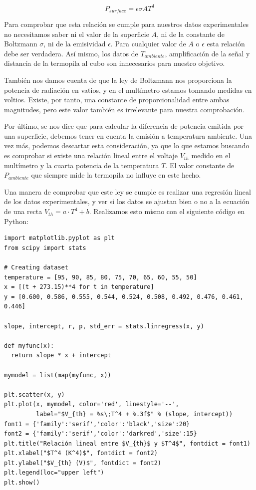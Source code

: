\begin{enumerate}
    \begin{equation*}
        P_{surface} = \epsilon \sigma A T^4
    \end{equation*}

    Para comprobar que esta relación se cumple para nuestros datos experimentales no necesitamos saber ni el valor de la superficie $A$,
    ni de la constante de Boltzmann $\sigma$, ni de la emisividad $\epsilon$. Para cualquier valor de $A$ o $\epsilon$ esta relación
    debe ser verdadera. Así mismo, los datos de $T_{ambiente}$, amplificación de la señal y distancia de la termopila al cubo
    son innecesarios para nuestro objetivo.

    También nos damos cuenta de que la ley de Boltzmann nos proporciona la potencia de radiación en vatios, y en el multímetro estamos tomando
    medidas en voltios. Existe, por tanto, una constante de proporcionalidad entre ambas magnitudes, pero este valor también
    es irrelevante para nuestra comprobación.

    Por último, se nos dice que para calcular la diferencia de potencia emitida por una superficie, debemos tener en cuenta la emisión a temperatura ambiente.
    Una vez más, podemos descartar esta consideración, ya que lo que estamos buscando es comprobar si existe una relación lineal
    entre el voltaje $V_{th}$ medido en el multímetro y la cuarta potencia de la temperatura $T$. El valor constante de $P_{ambiente}$
    que siempre mide la termopila no influye en este hecho.

    Una manera de comprobar que este ley se cumple es realizar una regresión lineal de los datos experimentales, y ver si los datos se ajustan bien o no
    a la ecuación de una recta $V_{th} = a \cdot T^4 + b$. Realizamos esto mismo con el siguiente código en Python:\\

    \begin{verbatim}
import matplotlib.pyplot as plt
from scipy import stats

# Creating dataset
temperature = [95, 90, 85, 80, 75, 70, 65, 60, 55, 50]
x = [(t + 273.15)**4 for t in temperature]
y = [0.600, 0.586, 0.555, 0.544, 0.524, 0.508, 0.492, 0.476, 0.461, 0.446]

slope, intercept, r, p, std_err = stats.linregress(x, y)

def myfunc(x):
  return slope * x + intercept

mymodel = list(map(myfunc, x))

plt.scatter(x, y)
plt.plot(x, mymodel, color='red', linestyle='--',
         label="$V_{th} = %s\;T^4 + %.3f$" % (slope, intercept))
font1 = {'family':'serif','color':'black','size':20}
font2 = {'family':'serif','color':'darkred','size':15}
plt.title("Relación lineal entre $V_{th}$ y $T^4$", fontdict = font1)
plt.xlabel("$T^4 (K^4)$", fontdict = font2)
plt.ylabel("$V_{th} (V)$", fontdict = font2)
plt.legend(loc="upper left")
plt.show()



\end{verbatim}
\end{enumerate}
